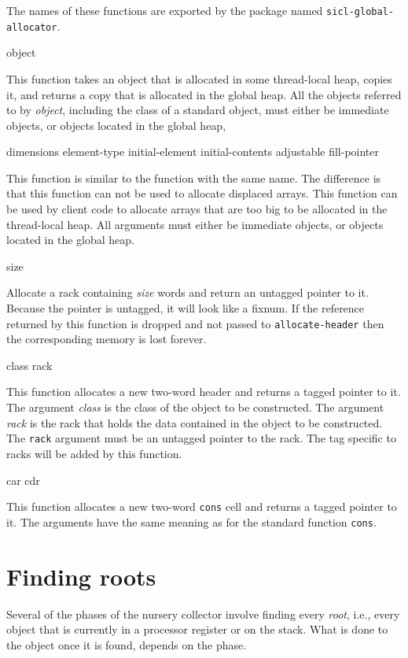 The names of these functions are exported by the package named
\texttt{sicl-global-allocator}.

 {object}

This function takes an object that is allocated in some thread-local
heap, copies it, and returns a copy that is allocated in the global
heap.  All the objects referred to by \textit{object}, including the
class of a standard object, must either be immediate objects, or
objects located in the global heap,

 {dimensions \key element-type initial-element
  initial-contents adjustable fill-pointer}

This function is similar to the \commonlisp{} function with the same
name.  The difference is that this function can not be used to
allocate displaced arrays.  This function can be used by client code
to allocate arrays that are too big to be allocated in the
thread-local heap.  All arguments must either be immediate objects, or
objects located in the global heap.

 {size}

Allocate a rack containing \textit{size} words and return an untagged
pointer to it.  Because the pointer is untagged, it will look like a
fixnum.  If the reference returned by this function is dropped and not
passed to \texttt{allocate-header} then the corresponding memory is
lost forever.

 {class rack}

This function allocates a new two-word header and returns a tagged
pointer to it.  The argument \textit{class} is the class of the object
to be constructed.  The argument \textit{rack} is the rack that holds
the data contained in the object to be constructed.  The \texttt{rack}
argument must be an untagged pointer to the rack.  The tag specific to
racks will be added by this function.

 {car cdr}

This function allocates a new two-word \texttt{cons} cell and returns
a tagged pointer to it.  The arguments have the same meaning as for
the standard \commonlisp{} function \texttt{cons}.

\section{Finding roots}
\label{sec-garbage-collection-finding-roots}

Several of the phases of the nursery collector involve finding every
\emph{root}, i.e., every \commonlisp{} object that is currently in a
processor register or on the stack.  What is done to the object once
it is found, depends on the phase.

